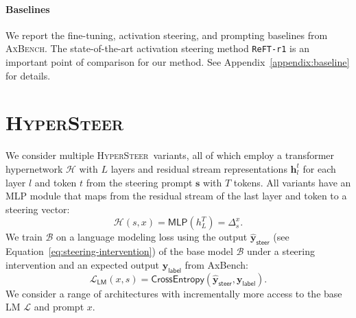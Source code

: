 \documentclass[11pt]{article}
\newcommand{\methodname}{\textsc{HyperSteer}}
\newcommand{\todo}[1]{\textcolor{red}{TODO: #1}}
\begin{document}


\paragraph{Baselines} We report the fine-tuning, activation steering, and prompting baselines from \textsc{AxBench}.
The state-of-the-art activation steering method \texttt{ReFT-r1} is an important point of comparison for our method. 
See Appendix~\ref{appendix:baseline} for details.


\section{\methodname}
We consider multiple \methodname\ variants, all of which employ a transformer hypernetwork $\mathcal{H}$ with $L$ layers and residual stream representations $\mathbf{h}^t_l$ for each layer $l$ and token $t$ from the steering prompt $\mathbf{s}$ with $T$ tokens. All variants have an MLP module that maps from the residual stream of the last layer and token to a steering vector: 
\begin{equation}
\mathcal{H}(s, x) = \mathsf{MLP}(h^T_L) =\Delta_s^x.
\label{eq:steeringhead}
\end{equation}
We train $\mathcal{B}$ on a language modeling loss using the output $\hat{\mathbf{y}}_{\mathsf{steer}}$ (see Equation~\ref{eq:steering-intervention}) of the base model $\mathcal{B}$ under a steering intervention and an expected output $\mathbf{y}_{\mathsf{label}}$ from AxBench:
\begin{equation}
\mathcal{L}_{\textsf{LM}}(x,s) =  \mathsf{CrossEntropy}(\hat{\mathbf{y}}_{\textsf{steer}},\mathbf{y}_{\textsf{label}}).
\label{eq:sft-loss}
\end{equation}
We consider a range of architectures with incrementally more access to the base LM $\mathcal{L}$ and prompt $x$. 
\end{document}
